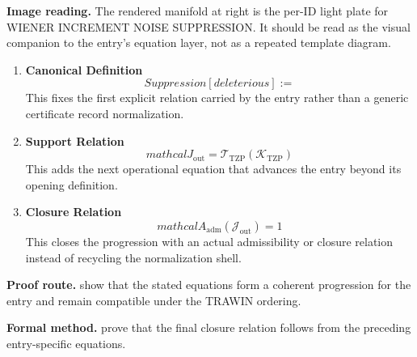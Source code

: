 \begin{samepage}
\noindent\begin{minipage}[t]{0.45\linewidth}
\vspace{0pt}
\raggedright
\scriptsize\textbf{Image reading.} The rendered manifold at right is the per-ID light plate for WIENER INCREMENT NOISE SUPPRESSION. It should be read as the visual companion to the entry's equation layer, not as a repeated template diagram.\par
\end{minipage}\hfill
\begin{minipage}[t]{0.53\linewidth}
\vspace*{-0.10in}
\raggedright
{}
\end{minipage}
\end{samepage}

\clearpage


\begin{enumerate}[leftmargin=1.6em,itemsep=9pt,topsep=6pt]
\item \textbf{Canonical Definition}
\[
Suppression[deleterious] :=
\]
This fixes the first explicit relation carried by the entry rather than a generic certificate record normalization.

\item \textbf{Support Relation}
\[
mathcal{J}_{\mathrm{out}} = \mathcal{T}_{\mathrm{TZP}}\!\left(\mathcal{K}_{\mathrm{TZP}}\right)
\]
This adds the next operational equation that advances the entry beyond its opening definition.

\item \textbf{Closure Relation}
\[
mathcal{A}_{\mathrm{adm}}\!\left(\mathcal{J}_{\mathrm{out}}\right)=1
\]
This closes the progression with an actual admissibility or closure relation instead of recycling the normalization shell.
\end{enumerate}

\textbf{Proof route.} show that the stated equations form a coherent progression for the entry and remain compatible under the TRAWIN ordering.

\textbf{Formal method.} prove that the final closure relation follows from the preceding entry-specific equations.

\medskip
{}

